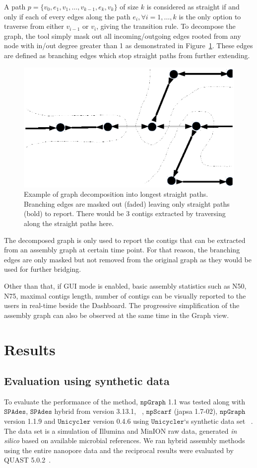 \documentclass[10pt,letterpaper]{article}
\newcommand{\npscarf}{$\mathtt{npScarf}$}
\newcommand{\npgraph}{$\mathtt{npGraph}$}
\newcommand{\lrscaf}{$\mathtt{npGraph}$}
\newcommand{\unicycler}{$\mathtt{Unicycler}$}
\newcommand{\spades}{$\mathtt{SPAdes}$}
\begin{document}
A path $p=\{v_0,e_1,v_1,\ldots,v_{k-1},e_k,v_k\}$ of size $k$ is considered as straight if and only if each of every edges along the path $e_i, \forall i=1,\ldots,k$ is the only option to traverse from either $v_{i-1}$ or $v_i$, giving the transition rule.
To decompose the graph, the tool simply mask out all incoming/outgoing edges rooted from any node with in/out degree greater than 1 as demonstrated in Figure~\ref{figure:npgraph_decompose}. These edges are defined as branching edges which stop straight paths from further extending.

\begin{figure}[!hpt]
\centering
\includegraphics[width=.6\textwidth]{images/Fig5.eps}
\caption{Example of graph decomposition into longest straight paths. Branching edges are masked out (faded) leaving only straight paths (bold) to report. There would be 3 contigs extracted by traversing along the straight paths here.}
\label{figure:npgraph_decompose}
\end{figure}

The decomposed graph is only used to report the contigs that can be extracted from an assembly graph at certain time point. For that reason, the branching edges are only masked but not removed from the original graph as they would be used for further bridging.

Other than that, if GUI mode is enabled, basic assembly statistics such as N50, N75, maximal contigs length, number of contigs can be visually reported to the users in real-time beside the Dashboard. The progressive simplification of the assembly graph can also be observed at the same time in the Graph view.


\section*{Results}
\subsection*{Evaluation using synthetic data}
To evaluate the performance of the method, \npgraph{} 1.1 was tested along with \spades{}, \spades{} hybrid from version 3.13.1, ~\cite{AntipovKM2015}, \npscarf{} (japsa 1.7-02), \lrscaf{} version 1.1.9 and \unicycler{} version 0.4.6 using \unicycler{}`s synthetic data set~ \cite{Wick2017unicycler} . 
The data set is a simulation of Illumina and MinION raw data, generated \emph{in silico} based on available microbial references.
We ran hybrid assembly methods using the entire nanopore data and the reciprocal results were evaluated by QUAST 5.0.2~\cite{Mikheenko2018quast5}. 
\end{document}
